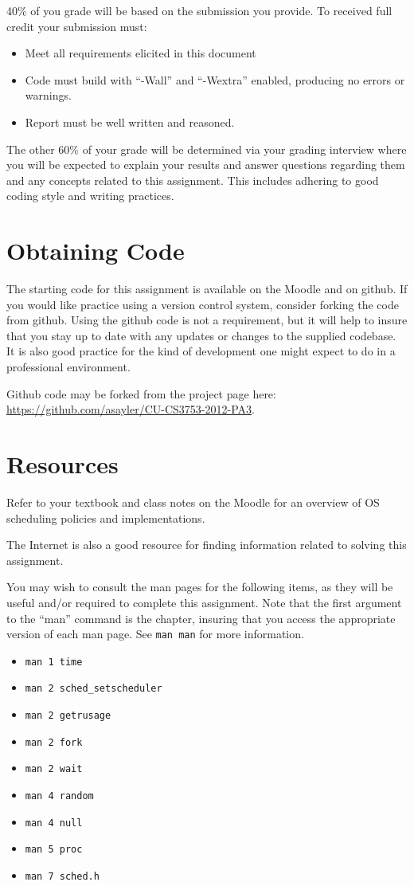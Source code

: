 \documentclass[12pt]{article}
\begin{document}
40\% of you grade will be based on the submission you provide.
To received full credit your submission must:
\begin{itemize}
\item Meet all requirements elicited in this document
\item Code must build with ``-Wall'' and ``-Wextra'' enabled,
  producing no errors or warnings.
\item Report must be well written and reasoned.
\end{itemize}

The other 60\% of your grade will be determined via your grading
interview where you will be expected to explain your results and answer
questions regarding them and any concepts related to this assignment.
This includes adhering to good coding style and writing practices.

\section{Obtaining Code}
The starting code for this assignment is available on the Moodle and
on github. If you would like practice using a version control system,
consider forking the code from github. Using the github code is not
a requirement, but it will help to insure that you stay up to date
with any updates or changes to the supplied codebase. It is also
good practice for the kind of development one might expect to do in
a professional environment.

Github code may be forked from the project page here:
\url{https://github.com/asayler/CU-CS3753-2012-PA3}.

\section{Resources}
Refer to your textbook and class notes on the Moodle for an overview
of OS scheduling policies and implementations.

The Internet is also a good resource for finding information related
to solving this assignment.

You may wish to consult the man pages for the following items, as they
will be useful and/or required to complete this assignment. Note that
the first argument to the ``man'' command is the chapter, insuring
that you access the appropriate version of each man page. See
\texttt{man man} for more information.
\begin{itemize}
\item \texttt{man 1 time}
\item \texttt{man 2 sched\_setscheduler}
\item \texttt{man 2 getrusage}
\item \texttt{man 2 fork}
\item \texttt{man 2 wait}
\item \texttt{man 4 random}
\item \texttt{man 4 null}
\item \texttt{man 5 proc}
\item \texttt{man 7 sched.h}
\end{itemize}
\end{document}
